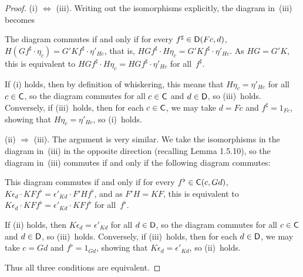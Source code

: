 \documentclass[../../solutions]{subfiles}
\begin{document}
\begin{proof}
  (i) $\Leftrightarrow$ (iii).  Writing out the isomorphisms
  explicitly, the diagram in~(iii) becomes
  \begin{center}
  \end{center}
  The diagram commutes if and only if for every
  $f^\sharp\in{\mathsf{D}}(Fc,d)$, $H(Gf^\sharp\cdot \eta_c)=G'Kf^\sharp\cdot
  \eta'_{Hc}$, that is, $HGf^\sharp\cdot H\eta_c=G'Kf^\sharp\cdot
  \eta'_{Hc}$.  As $HG=G'K$, this is equivalent to $HGf^\sharp\cdot
  H\eta_c = HGf^\sharp\cdot\eta'_{Hc}$ for all~$f^\sharp$.

  If (i) holds, then by definition of whiskering, this means that
  $H\eta_c=\eta'_{Hc}$ for all $c\in{\mathsf{C}}$, so the diagram commutes for
  all $c\in{\mathsf{C}}$ and $d\in{\mathsf{D}}$, so (iii)~holds.  Conversely, if
  (iii)~holds, then for each $c\in{\mathsf{C}}$, we may take $d=Fc$ and
  $f^\sharp=1_{Fc}$, showing that $H\eta_c=\eta'_{Hc}$, so (i)~holds.

  \bigskip
  (ii) $\Rightarrow$ (iii).  The argument is very similar.  We take
  the isomorphisms in the diagram in~(iii) in the opposite direction
  (recalling Lemma 1.5.10), so the diagram in~(iii) commutes if and
  only if the following diagram commutes:
  \begin{center}
  \end{center}
  This diagram commutes if and only if for every
  $f^\flat\in{\mathsf{C}}(c,Gd)$,
  $K\epsilon_d\cdot KFf^\flat = \epsilon'_{Kd}\cdot F'Hf^\flat$, and
  as $F'H=KF$, this is equivalent to
  $K\epsilon_d\cdot KFf^\flat = \epsilon'_{Kd}\cdot KFf^\flat$ for
  all~$f^\flat$.

  If (ii) holds, then $K\epsilon_d=\epsilon'_{Kd}$ for all $d\in{\mathsf{D}}$,
  so the diagram commutes for all $c\in{\mathsf{C}}$ and $d\in{\mathsf{D}}$, so
  (iii)~holds.  Conversely, if (iii)~holds, then for each $d\in{\mathsf{D}}$,
  we may take $c=Gd$ and $f^\flat=1_{Gd}$, showing that
  $K\epsilon_d=\epsilon'_{Kd}$, so (ii)~holds.

  Thus all three conditions are equivalent.
\end{proof}
\end{document}
